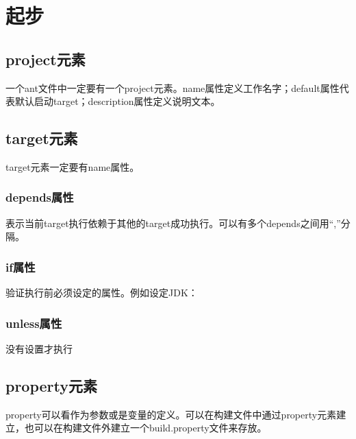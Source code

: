 
\chapter{起步}

\section{project元素}

	一个ant文件中一定要有一个project元素。name属性定义工作名字；default属性代表默认启动target；description属性定义说明文本。

	

\section{target元素}

	target元素一定要有name属性。

	\subsection{depends属性}

		表示当前target执行依赖于其他的target成功执行。可以有多个depends之间用“,”分隔。

		

	\subsection{if属性}

		验证执行前必须设定的属性。例如设定JDK：

		

	\subsection{unless属性}

		没有设置才执行

		

\section{property元素}

	property可以看作为参数或是变量的定义。可以在构建文件中通过property元素建立，也可以在构建文件外建立一个build.property文件来存放。

